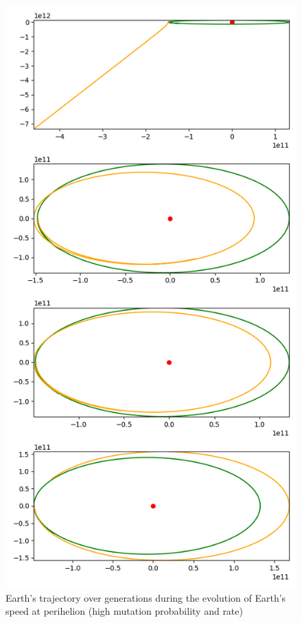 \begin{figure}
    \center
    \includegraphics[scale=.3]{img/perihelion_speed_test_0.90_0.90_10_5.png}
    \caption{Earth's trajectory over generations during the evolution of
        Earth's speed at perihelion (high mutation probability and rate)}
    \label{speed_high}
\end{figure}

